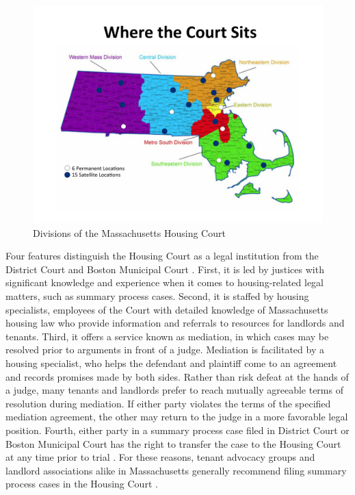 \documentclass[12pt]{article}
\begin{document}
\begin{landscape}
    

        \begin{figure}
            \centering
            \includegraphics[scale=0.75]{research/institutional_context/sources/map_of_where_court_sits_-_jan_2019.pdf}
            \caption{Divisions of the Massachusetts Housing Court \citep{housing_court_4_all_housing_nodate}}
        \end{figure}
\end{landscape}        
        
        Four features distinguish the Housing Court as a legal institution from the District Court and Boston Municipal Court \citep{noauthor_housing_nodate}. First, it is led by justices with significant knowledge and experience when it comes to housing-related legal matters, such as summary process cases. Second, it is staffed by housing specialists, employees of the Court with detailed knowledge of Massachusetts housing law who provide information and referrals to resources for landlords and tenants. Third, it offers a service known as mediation, in which cases may be resolved prior to arguments in front of a judge. Mediation is facilitated by a housing specialist, who helps the defendant and plaintiff come to an agreement and records promises made by both sides. Rather than risk defeat at the hands of a judge, many tenants and landlords prefer to reach mutually agreeable terms of resolution during mediation. If either party violates the terms of the specified mediation agreement, the other may return to the judge in a more favorable legal position. Fourth, either party in a summary process case filed in District Court or Boston Municipal Court has the right to transfer the case to the Housing Court at any time prior to trial . For these reasons, tenant advocacy groups and landlord associations alike in Massachusetts generally recommend filing summary process cases in the Housing Court \citep{noauthor_massachusetts_nodate, noauthor_housing_nodate}.
\end{document}
